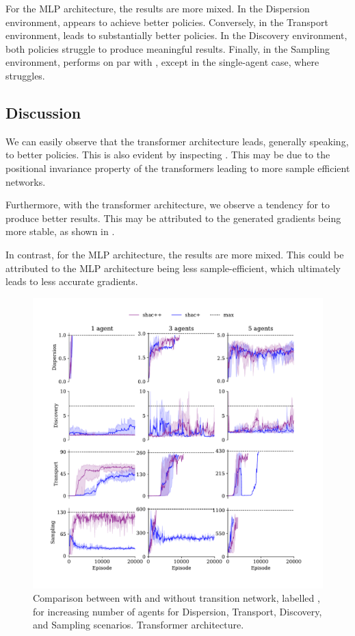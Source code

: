For the MLP architecture, the results are more mixed. In the Dispersion environment, \fname{} appears to achieve better policies. Conversely, in the Transport environment, \fnamer{} leads to substantially better policies. In the Discovery environment, both policies struggle to produce meaningful results. Finally, in the Sampling environment, \fname{} performs on par with \fnamer{}, except in the single-agent case, where \fnamer{} struggles.

\subsection{Discussion}
We can easily observe that the transformer architecture leads, generally speaking, to better policies. This is also evident by inspecting . This may be due to the positional invariance property of the transformers leading to more sample efficient networks. 

Furthermore, with the transformer architecture, we observe a tendency for \fname{} to produce better results. This may be attributed to the generated gradients being more stable, as shown in .

In contrast, for the MLP architecture, the results are more mixed. This could be attributed to the MLP architecture being less sample-efficient, which ultimately leads to less accurate gradients.

\begin{figure}[t]
    \centering
    \includegraphics[width=\textwidth]{figs/ablation-transformer.pdf}
    \caption{Comparison between \fname{} with and without transition network, labelled \fnamer{}, for increasing number of agents for Dispersion, Transport, Discovery, and Sampling scenarios. Transformer architecture.}
    \label{fig:ablation-transformer}\vspace{0.5cm}
\end{figure}

